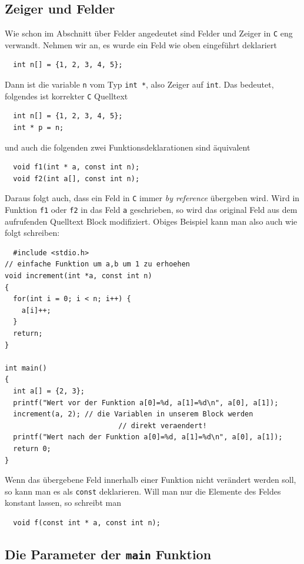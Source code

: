 \subsection{Zeiger und Felder}

Wie schon im Abschnitt über Felder angedeutet sind Felder und Zeiger in \texttt{C} eng verwandt.
Nehmen wir an, es wurde ein Feld wie oben eingeführt deklariert
\begin{lstlisting}
  int n[] = {1, 2, 3, 4, 5};
\end{lstlisting}
Dann ist die variable \verb|n| vom Typ \verb|int *|, also Zeiger auf \verb|int|.
Das bedeutet, folgendes ist korrekter \texttt{C} Quelltext
\begin{lstlisting}
  int n[] = {1, 2, 3, 4, 5};
  int * p = n;
\end{lstlisting}
und auch die folgenden zwei Funktionsdeklarationen sind äquivalent
\begin{lstlisting}
  void f1(int * a, const int n);
  void f2(int a[], const int n);
\end{lstlisting}
Daraus folgt auch, dass ein Feld in \texttt{C} immer \emph{by reference} übergeben wird.
Wird in Funktion \texttt{f1} oder \texttt{f2} in das Feld \texttt{a} geschrieben, so wird das original Feld aus dem aufrufenden Quelltext Block modifiziert.
Obiges Beispiel kann man also auch wie folgt schreiben:
\begin{lstlisting}
  #include <stdio.h>
// einfache Funktion um a,b um 1 zu erhoehen
void increment(int *a, const int n)
{
  for(int i = 0; i < n; i++) {
    a[i]++;
  }
  return;
}

int main()
{
  int a[] = {2, 3};
  printf("Wert vor der Funktion a[0]=%d, a[1]=%d\n", a[0], a[1]);
  increment(a, 2); // die Variablen in unserem Block werden
                           // direkt veraendert!
  printf("Wert nach der Funktion a[0]=%d, a[1]=%d\n", a[0], a[1]);
  return 0;
}
\end{lstlisting}
Wenn das übergebene Feld innerhalb einer Funktion nicht verändert werden soll, so kann man es als \verb|const| deklarieren.
Will man nur die Elemente des Feldes konstant lassen, so schreibt man
\begin{lstlisting}
  void f(const int * a, const int n);
\end{lstlisting}


\subsection{Die Parameter der \texttt{main} Funktion}

